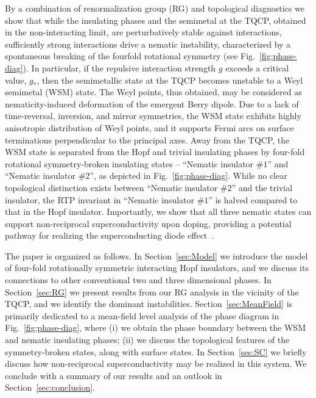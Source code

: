\documentclass[reprint,floatfix, twocolumn]{revtex4-1}
\begin{document}
By a combination of renormalization group (RG) and topological diagnostics we show that while the insulating phases and the semimetal at the TQCP, obtained in the non-interacting limit, are perturbatively stable against interactions, sufficiently strong interactions drive a nematic instability, characterized by a spontaneous breaking of the fourfold rotational symmetry (see Fig.~\ref{fig:phase-diag}). 
In particular, if the repulsive interaction strength $g$ exceeds a critical value, $g_*$, then the semimetallic state at the TQCP becomes unstable to a Weyl semimetal (WSM) state. 
The Weyl points, thus obtained, may be considered as nematicity-induced deformation of the emergent Berry dipole.
Due to a lack of time-reversal, inversion, and mirror symmetries, the WSM state exhibits highly anisotropic distribution of Weyl points, and it supports Fermi arcs on surface terminations perpendicular to the principal axes.
Away from the TQCP, the WSM state is separated from the Hopf and  trivial insulating phases by four-fold rotational symmetry-broken insulating states -- ``Nematic insulator $\#1$'' and ``Nematic insulator $\#2$'', as depicted in Fig.~\ref{fig:phase-diag}.
While no clear topological distinction exists between ``Nematic insulator $\#2$'' and the trivial insulator, the RTP invariant in ``Nematic insulator $\#1$'' is halved compared to that in the Hopf insulator.
Importantly, we show that all three nematic states can support non-reciprocal superconductivity upon doping, providing a potential pathway for realizing the superconducting diode effect~\cite{Nadeem2023,Ando2020,Wu2022,Lin2022,davydova2024}.

The paper is organized as follows. In Section~\ref{sec:Model} we introduce the model of four-fold rotationally symmetric interacting Hopf insulators, and we discuss its connections to other conventional two and three dimensional phases. 
In Section~\ref{sec:RG} we present results from our RG analysis in the vicinity of the TQCP, and we  identify the dominant instabilities.
Section~\ref{sec:MeanField} is primarily dedicated to a mean-field level analysis of the phase diagram in Fig.~\ref{fig:phase-diag}, where (i) we obtain the phase boundary between the WSM and nematic insulating phases; 
(ii) we discuss the topological features of the symmetry-broken states, along with surface states.
In Section~\ref{sec:SC} we  briefly discuss how non-reciprocal superconductivity may be realized in this system. 
We conclude with a summary of our  results and an outlook in Section~\ref{sec:conclusion}.
\end{document}

